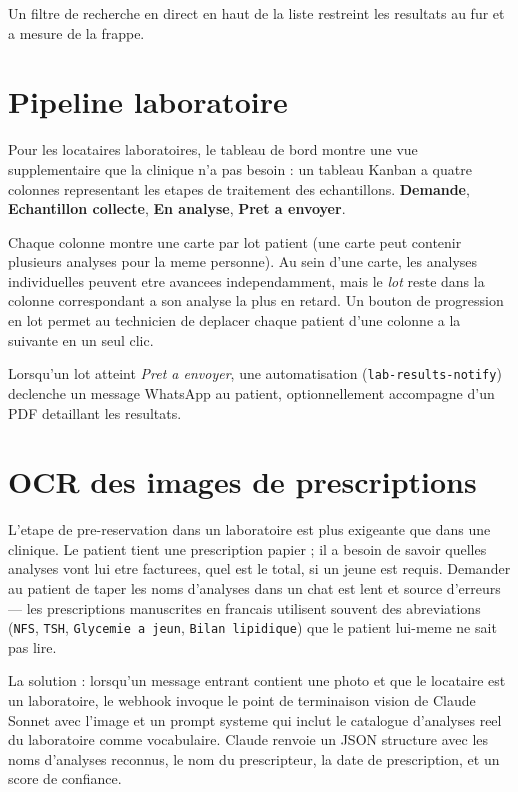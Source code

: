 Un filtre de recherche en direct en haut de la liste restreint les
resultats au fur et a mesure de la frappe.

\section{Pipeline laboratoire}
Pour les locataires laboratoires, le tableau de bord montre une vue
supplementaire que la clinique n'a pas besoin : un tableau Kanban a
quatre colonnes representant les etapes de traitement des echantillons.
\textbf{Demande}, \textbf{Echantillon collecte}, \textbf{En analyse},
\textbf{Pret a envoyer}.

Chaque colonne montre une carte par lot patient (une carte peut
contenir plusieurs analyses pour la meme personne). Au sein d'une
carte, les analyses individuelles peuvent etre avancees independamment,
mais le \emph{lot} reste dans la colonne correspondant a son analyse la
plus en retard. Un bouton de progression en lot permet au technicien de
deplacer chaque patient d'une colonne a la suivante en un seul clic.

Lorsqu'un lot atteint \emph{Pret a envoyer}, une automatisation
(\texttt{lab-results-notify}) declenche un message WhatsApp au patient,
optionnellement accompagne d'un PDF detaillant les resultats.

\section{OCR des images de prescriptions}
L'etape de pre-reservation dans un laboratoire est plus exigeante que
dans une clinique. Le patient tient une prescription papier ; il a
besoin de savoir quelles analyses vont lui etre facturees, quel est le
total, si un jeune est requis. Demander au patient de taper les noms
d'analyses dans un chat est lent et source d'erreurs --- les
prescriptions manuscrites en francais utilisent souvent des
abreviations (\texttt{NFS}, \texttt{TSH}, \texttt{Glycemie a jeun},
\texttt{Bilan lipidique}) que le patient lui-meme ne sait pas lire.

La solution : lorsqu'un message entrant contient une photo et que le
locataire est un laboratoire, le webhook invoque le point de
terminaison vision de Claude Sonnet avec l'image et un prompt systeme
qui inclut le catalogue d'analyses reel du laboratoire comme
vocabulaire. Claude renvoie un JSON structure avec les noms d'analyses
reconnus, le nom du prescripteur, la date de prescription, et un score
de confiance.

